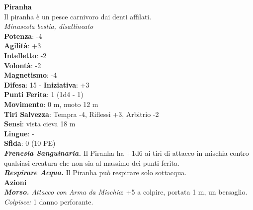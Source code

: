 \begin{multicols}{2}
\medskip\textbf{Piranha}\\
Il piranha è un pesce carnivoro dai denti affilati.\\
\emph{Minuscola bestia, disallineato}\\
\textbf{Potenza}: -4\\
\textbf{Agilità}: +3\\
\textbf{Intelletto}: -2\\
\textbf{Volontà}: -2\\
\textbf{Magnetismo}: -4\\
\textbf{Difesa}: 15 - \textbf{Iniziativa}: +3\\
\textbf{Punti Ferita}: 1 (1d4 - 1)\\
\textbf{Movimento}: 0 m, nuoto 12 m\\
\textbf{Tiri Salvezza}: Tempra -4, Riflessi +3, Arbitrio -2 \\
\textbf{Sensi}: vista cieva 18 m\\
\textbf{Lingue}: -\\
\textbf{Sfida}: 0 (10 PE)\smallskip\\
\emph{\textbf{Frenesia Sanguinaria.}} Il Piranha ha +1d6 ai tiri di attacco in mischia contro qualsiasi creatura che non sia al massimo dei punti ferita.\\
\emph{\textbf{Respirare Acqua.}} Il Piranha può respirare solo sottacqua.\\ \smallskip\textbf{Azioni}\\
\emph{\textbf{Morso.} Attacco con Arma da Mischia}: +5 a colpire, portata 1 m, un bersaglio.
\emph{Colpisce:} 1 danno perforante.\\


\end{multicols}
